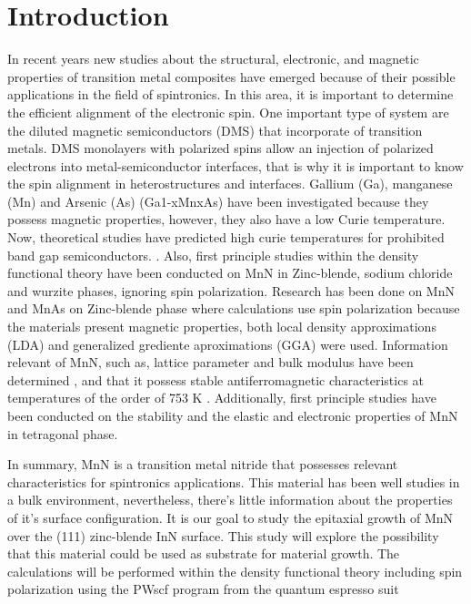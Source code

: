 \documentclass[12pt]{report}
\begin{document}
\chapter{Introduction }
In recent years new studies about the structural, electronic, and magnetic properties of transition metal composites have emerged because of their possible applications in the field of spintronics. In this area, it is important to determine the efficient alignment of the electronic spin. One important type of system are the diluted magnetic semiconductors (DMS) that incorporate of transition metals. DMS monolayers with polarized spins allow an injection of polarized electrons into metal-semiconductor interfaces, that is why it is important to know the spin alignment in heterostructures and interfaces. Gallium (Ga), manganese (Mn) and Arsenic (As) (Ga1-xMnxAs) have been investigated because they possess magnetic properties, however, they also have a low Curie temperature. 
Now, theoretical studies have predicted high curie temperatures for prohibited band gap semiconductors. \cite{dietl2001hole}.
Also, first principle studies within the density functional theory have been conducted on MnN in Zinc-blende, sodium chloride and wurzite phases, ignoring spin polarization. \cite{paiva2004first}
Research has been done on MnN and MnAs on Zinc-blende phase where calculations use spin polarization because the materials present magnetic properties, both local density approximations (LDA) and generalized grediente aproximations (GGA) were used.\cite{Espitia2017}
Information relevant of MnN, such as, lattice parameter and bulk modulus have been determined \cite{cheng2005first}, and that it possess stable antiferromagnetic characteristics at temperatures of the order of 753 K \cite{suzuki2000crystal}. Additionally, first principle studies have been conducted on the stability and the elastic and electronic properties of MnN in tetragonal phase.\cite{yu2015stability}

In summary, MnN is a transition metal nitride that possesses relevant characteristics for spintronics applications. This material has been well studies in a bulk environment, nevertheless, there's little information about the properties of it's surface configuration.
It is our goal to study the epitaxial growth of MnN over the (111) zinc-blende InN surface. This study will explore the possibility that this material could be used as substrate for material growth.
The calculations will be performed within the density functional theory including spin polarization using the PWscf program from the quantum espresso suit \cite{giannozzi2009quantum}
\end{document}
